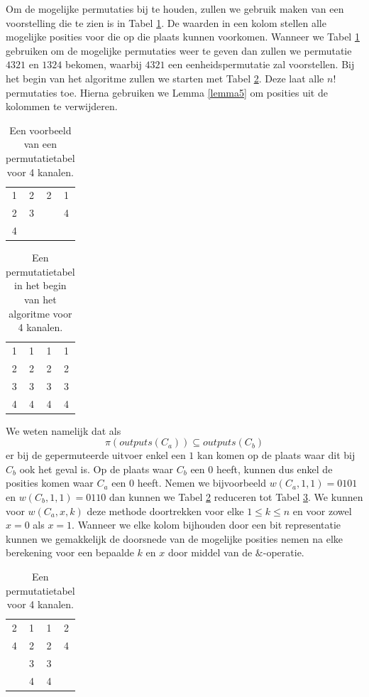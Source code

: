\documentclass{article}
\begin{document}
Om de mogelijke permutaties bij te houden, zullen we gebruik maken van een voorstelling die te zien is in Tabel \ref{tabel4}.
De waarden in een kolom stellen alle mogelijke posities voor die op die plaats kunnen voorkomen.
Wanneer we Tabel  \ref{tabel4} gebruiken om de mogelijke permutaties weer te geven dan zullen we permutatie $4321$ en $1324$  bekomen, waarbij $4321$ een eenheidspermutatie zal voorstellen.
Bij het begin van het algoritme zullen we starten met Tabel \ref{tabel5}.
Deze laat alle $n!$ permutaties toe.
Hierna gebruiken we Lemma \ref{lemma5} om posities uit de kolommen te verwijderen.
\begin{table}[!h]
	\centering
	\begin{tabular}{|c|c|c|c|}
	\hline
	1 & 2 & 2 & 1 \\ 
	2 & 3 &  &  4\\ 
	4 &  &  &  \\ 
	\hline 
	\end{tabular}
	\caption{Een voorbeeld van een permutatietabel voor 4 kanalen.}
	\label{tabel4}
\end{table}
\begin{table}[!h]
	\centering
	\begin{tabular}{|c|c|c|c|}
	\hline
	1 & 1 & 1 & 1 \\ 
	2 & 2 & 2 & 2\\ 
	3 & 3 & 3 & 3 \\
	4 & 4 & 4 & 4\\ 
	\hline 
	\end{tabular}
	\caption{Een permutatietabel in het begin van het algoritme voor 4 kanalen.}
\label{tabel5}
\end{table}

We weten namelijk dat als \[{\pi\left(outputs\left(C_a\right)\right) \subseteq outputs\left(C_b\right)}\] er bij de gepermuteerde uitvoer enkel een $1$ kan komen op de plaats waar dit bij $C_b$ ook het geval is.
Op de plaats waar $C_b$ een $0$ heeft, kunnen dus enkel de posities komen waar $C_a$ een $0$ heeft.
Nemen we bijvoorbeeld $w\left(C_a,1,1\right) = 0101$ en ${w\left(C_b,1,1\right)=0110}$ dan kunnen we Tabel \ref{tabel5} reduceren tot Tabel \ref{tabel6}.
We kunnen voor $w\left(C_a, x, k\right)$ deze methode doortrekken voor elke $1 \leq k \leq n$ en voor zowel $x = 0$ als $x = 1$.
Wanneer we elke kolom bijhouden door een bit representatie kunnen we gemakkelijk de doorsnede van de mogelijke posities nemen na elke berekening voor een bepaalde $k$ en $x$ door middel van de $\&$-operatie. 
\begin{table}[!h]
	\centering
	\begin{tabular}{|c|c|c|c|}
	\hline
	2 & 1 & 1 & 2 \\ 
	4 & 2 & 2 & 4\\ 
	 & 3 & 3 &  \\
	 & 4 & 4 & \\ 
	\hline 
	\end{tabular}
	\caption{Een permutatietabel voor 4 kanalen.}
	\label{tabel6}
\end{table}
\end{document}
